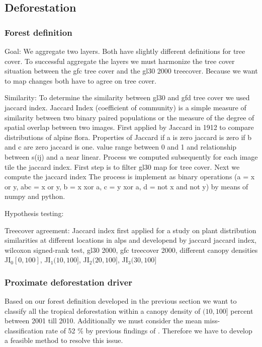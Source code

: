 	\subsection{Deforestation}
		\subsubsection{Forest definition}
			Goal:
			We aggregate two layers. Both have slightly different definitions for tree cover. To successful aggregate the layers we must harmonize the tree cover situation between the gfc tree cover and the gl30 2000 treecover. Because we want to map changes both have to agree on tree cover.

			Similarity:
			To determine the similarity between gl30 and gfd tree cover we used jaccard index. Jaccard Index (coefficient of community) is a simple measure of similarity between two binary paired populations or the measure of the degree of spatial overlap between two images. First applied by Jaccard in 1912 to compare distributions of alpine flora. Properties of Jaccard if a is zero jaccard is zero if b and c are zero jaccard is one. value range between 0 and 1 and relationship between s(ij) and a near linear. Process we computed subsequently for each image tile the jaccard index. First step is to filter gl30 map for tree cover. Next we compute the jaccard index  The process is implement as binary operations (a = x or y, abc = x or y, b = x xor a, c = y xor a, d = not x and not y) by means of numpy and python.

			Hypothesis testing:

			Treecover agreement: Jaccard index first applied for a study on plant distribution similarities at different locations in alps and developend by jaccard \citep{Jaccard1912,Shi1993,Sampat2009} jaccard index, wilcoxon signed-rank test, gl30 2000, gfc treecover 2000, different canopy densities JI$_0$$[0,100]$, JI$_{1}$$(10,100]$, JI$_{2}$$(20,100]$, JI$_{3}$$(30,100]$ 

		\subsubsection{Proximate deforestation driver}
			Based on our forest definition developed in the previous section we want to classify all the tropical deforestation within a canopy density of $(10,100]$ percent between 2001 till 2010. Additionally we must consider the mean miss-classification rate of 52 \% by previous findings of \citeauthor{Seydewitz2017} \citep{Seydewitz2017}. Therefore we have to develop a feasible method to resolve this issue.

